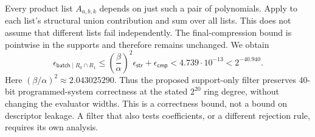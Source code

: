 Every product list $A_{a,b,k}$ depends on just such a pair of polynomials.
Apply  to each list's structural
union contribution and sum over all lists.  This does not assume that
different lists fail independently.  The final-compression bound is
pointwise in the supports and therefore remains unchanged.  We obtain
\begin{equation}\label{eq:rc-filtered-hash-bound}
 \epsilon_{\mathsf{batch}\mid R_0\cap R_1}
 \le \left(\frac{\beta}{\alpha}\right)^2\epsilon_{\mathsf{str}}
     +\epsilon_{\mathsf{cmp}}
 <4.739\cdot10^{-13}<2^{-40.940}.
\end{equation}
Here $(\beta/\alpha)^2\approx2.043025290$.  Thus the proposed support-only
filter preserves 40-bit programmed-system correctness at the stated
$2^{20}$ ring degree, without changing the evaluator widths.  This is a
correctness bound, not a bound on descriptor leakage.  A filter that also
tests coefficients, or a different rejection rule, requires its own analysis.
